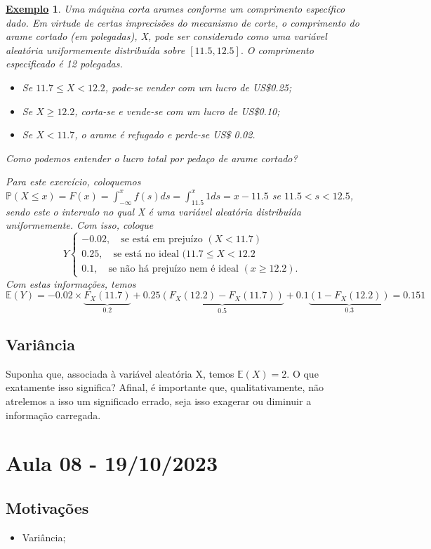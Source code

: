 \documentclass{article}
\newtheorem{example}{\underline{Exemplo}}
\begin{document}
\begin{example}
  Uma máquina corta arames conforme um comprimento específico dado. Em virtude de certas imprecisões do mecanismo de corte, o comprimento
  do arame cortado (em polegadas), X, pode ser considerado como uma variável aleatória uniformemente distribuída sobre \([11.5, 12.5].\) O
  comprimento especificado é 12 polegadas.
  \begin{itemize}
    \item Se \(11.7\leq X < 12.2\), pode-se vender com um lucro de US\$0.25;
    \item Se \(X\geq 12.2\), corta-se e vende-se com um lucro de US\$0.10;
    \item Se \(X < 11.7\), o arame é refugado e perde-se US\$ 0.02.
  \end{itemize}
  Como podemos entender o lucro total por pedaço de arame cortado?

  Para este exercício, coloquemos \(\mathbb{P}(X\leq x) = F(x) = \int_{-\infty}^{x}f(s)ds = \int_{11.5}^{x}1ds = x - 11.5\) se \(11.5 < s < 12.5\), sendo este o intervalo no qual
  X é uma variável aleatória distribuída uniformemente. Com isso, coloque 
  \[
    Y \left\{\begin{array}{ll}
        -0.02,\quad \text{se está em prejuízo }(X < 11.7)\\
        0.25,\quad \text{se está no ideal }(11.7\leq X < 12.2\\
        0.1,\quad \text{se não há prejuízo nem é ideal }(x\geq 12.2).
    \end{array}\right.
  \]
  Com estas informações, temos 
  \[
    \mathbb{E}(Y) = -0.02\times \underbrace{F_{X}(11.7)}_{0.2} + 0.25\underbrace{(F_{X}(12.2)-F_{X}(11.7))}_{0.5} + 0.1\underbrace{(1-F_{X}(12.2))}_{0.3} = 0.151
  \]
\end{example}
\subsection{Variância}
Suponha que, associada à variável aleatória X, temos \(\mathbb{E}(X) = 2\). O que exatamente isso significa? Afinal, é importante que, qualitativamente,
não atrelemos a isso um significado errado, seja isso exagerar ou diminuir a informação carregada.
\newpage

\section{Aula 08 - 19/10/2023}
\subsection{Motivações} 
\begin{itemize}
  \item Variância;
\end{itemize}
\end{document}
